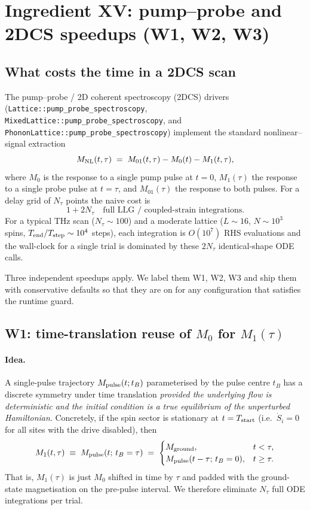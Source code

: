 \documentclass[11pt,letterpaper]{article}
\begin{document}
\section{Ingredient XV: pump--probe and 2DCS speedups (W1, W2, W3)}
\label{sec:pump-probe-w123}

\subsection{What costs the time in a 2DCS scan}

The pump--probe / 2D coherent spectroscopy (\textsc{2DCS}) drivers
(\texttt{Lattice::pump\_probe\_spectroscopy},
\texttt{MixedLattice::pump\_probe\_spectroscopy}, and
\texttt{PhononLattice::pump\_probe\_spectroscopy}) implement the
standard nonlinear--signal extraction
\[
M_{\rm NL}(t,\tau) \;=\; M_{01}(t,\tau) - M_0(t) - M_1(t,\tau),
\]
where $M_0$ is the response to a single pump pulse at $t=0$,
$M_1(\tau)$ the response to a single probe pulse at $t=\tau$, and
$M_{01}(\tau)$ the response to both pulses.  For a delay grid of
$N_\tau$ points the naive cost is
\[
1 + 2 N_\tau \quad\text{full LLG / coupled-strain integrations.}
\]
For a typical THz scan ($N_\tau \sim 100$) and a moderate lattice
($L \sim 16$, $N \sim 10^3$ spins, $T_{\rm end}/T_{\rm step} \sim
10^4$ steps), each integration is $O(10^7)$ RHS evaluations and
the wall-clock for a single trial is dominated by these
$2 N_\tau$ identical-shape ODE calls.

Three independent speedups apply.  We label them W1, W2, W3 and
ship them with conservative defaults so that they are on for any
configuration that satisfies the runtime guard.

\subsection{W1: time-translation reuse of $M_0$ for $M_1(\tau)$}
\label{sec:w1}

\paragraph{Idea.}  A single-pulse trajectory $M_{\rm pulse}(t;t_B)$
parameterised by the pulse centre $t_B$ has a discrete symmetry
under time translation \emph{provided the underlying flow is
deterministic and the initial condition is a true equilibrium of
the unperturbed Hamiltonian}.  Concretely, if the spin sector is
stationary at $t = T_{\rm start}$ (i.e.\ $\dot S_i = 0$ for all
sites with the drive disabled), then
\[
M_1(t,\tau) \;\equiv\; M_{\rm pulse}(t;\,t_B = \tau)
\;=\;
\begin{cases}
M_{\rm ground}, & t < \tau, \\
M_{\rm pulse}(t-\tau;\,t_B = 0), & t \geq \tau.
\end{cases}
\]
That is, $M_1(\tau)$ is just $M_0$ shifted in time by $\tau$ and
padded with the ground-state magnetisation on the pre-pulse
interval.  We therefore eliminate $N_\tau$ full ODE integrations
per trial.
\end{document}
